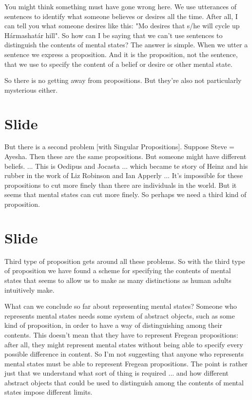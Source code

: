 \documentclass[12pt,\papersize]{extarticle}
\begin{document}
You might think something must have gone wrong here.
We use utterances of sentences to identify what someone believes or desires all the time. 
After all, I can tell you what someone desires like this: "Mo desires that s/he will cycle up Hármashatár hill".
So how can I be saying that we can’t use sentences to distinguish the contents of mental states?
The answer is simple.
When we utter a sentence we express a proposition.
And it is the proposition, not the sentence, that we use to specify the content of a belief or desire or other mental state.

So there is no getting away from propositions.
But they’re also not particularly mysterious either.


\section{Slide}
But there is a second problem [with Singular Propositions].  Suppose Steve = Ayesha.  Then these are the same propositions.  But someone might have different beliefs. ... This is Oedipus and Jocasta ... which became te story of Heinz and his rubber in the work of Liz Robinson and Ian Apperly ... It’s impossible for these propositions to cut more finely than there are individuals in the world.  But it seems that mental states can cut more finely.  So perhaps we need a third kind of proposition.


\section{Slide}
Third type of proposition gets around all these problems.
So with the third type of proposition we have found a scheme for specifying the contents of mental states that seems to allow us to make as many distinctions as human adults intuitively make.

What can we conclude so far about representing mental states?
Someone who represents mental states needs some system of abstract objects, such as some kind of proposition, in order to have a way of distinguishing among their contents.
This doesn’t mean that they have to represent Fregean propositions: after all, they might represent mental states without being able to specify every possible difference in content.
So I’m not suggesting that anyone who represents mental states must be able to represent Fregean propositions.
The point is rather just that we understand what sort of thing is required ... and how different abstract objects that could be used to distinguish among the contents of mental states impose different limits.
\end{document}
